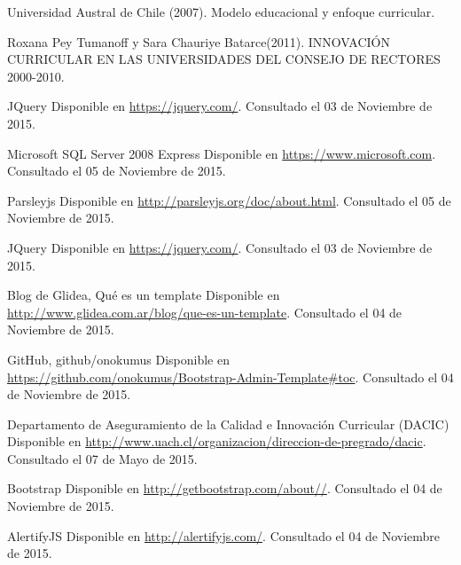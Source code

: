 \begin{spacing}{1.0}
\begin{thebibliography}{99}  

\newblock Universidad Austral de Chile (2007).
\newblock Modelo educacional y enfoque curricular. 

\newblock Roxana Pey Tumanoff y Sara Chauriye Batarce(2011).
\newblock INNOVACIÓN CURRICULAR EN LAS UNIVERSIDADES DEL CONSEJO DE RECTORES 2000-2010. 


\newblock JQuery
\newblock Disponible en \url{https://jquery.com/}.
\newblock Consultado el 03 de Noviembre de 2015.

\newblock Microsoft SQL Server 2008 Express 
\newblock Disponible en \url{https://www.microsoft.com}.
\newblock Consultado el 05 de Noviembre de 2015.

\newblock Parsleyjs
\newblock Disponible en \url{http://parsleyjs.org/doc/about.html}.
\newblock Consultado el 05 de Noviembre de 2015.

\newblock JQuery
\newblock Disponible en \url{https://jquery.com/}.
\newblock Consultado el 03 de Noviembre de 2015.

\newblock Blog de Glidea, Qué es un template
\newblock Disponible en \url{http://www.glidea.com.ar/blog/que-es-un-template}.
\newblock Consultado el 04 de Noviembre de 2015.

\newblock GitHub, github/onokumus
\newblock Disponible en \url{https://github.com/onokumus/Bootstrap-Admin-Template#toc}.
\newblock Consultado el 04 de Noviembre de 2015.

\newblock Departamento de Aseguramiento de la Calidad e Innovación Curricular (DACIC)
\newblock Disponible en \url{http://www.uach.cl/organizacion/direccion-de-pregrado/dacic}.
\newblock Consultado el 07 de Mayo de 2015.

\newblock Bootstrap
\newblock Disponible en \url{http://getbootstrap.com/about//}.
\newblock Consultado el 04 de Noviembre de 2015.

\newblock AlertifyJS
\newblock Disponible en \url{http://alertifyjs.com/}.
\newblock Consultado el 04 de Noviembre de 2015.


\end{thebibliography}
\end{spacing}
